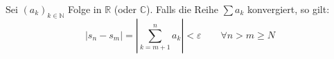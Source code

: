 Sei $(a_k)_{k \in \mathbb{N}}$ Folge in $\mathbb{R}$ (oder $\mathbb{C}$). Falls die Reihe $\sum a_k$ konvergiert, so gilt:
$$|s_n - s_m| = \left|\sum_{k=m+1}^{n} a_k\right| < \varepsilon \qquad \forall n > m \geq N$$